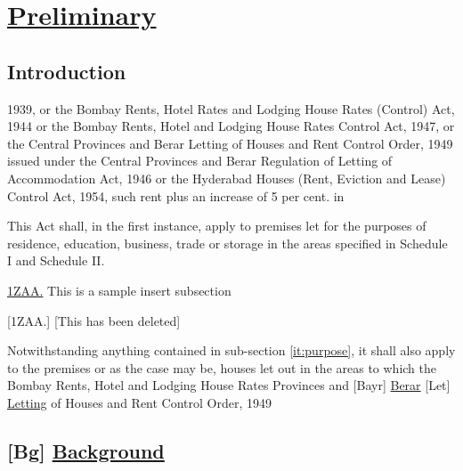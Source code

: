\documentclass[default]{report}
\newcommand{\ins}[1]{\underline{#1}}
\newcommand{\del}[1]{[#1]}
\newcommand{\subs}[2]{\del{#1} \ins{#2}}
\newcommand{\sectionedit}[2]{%
	\titlelabel{#1\quad}
	\section{#2}
	\titlelabel{\thesection\quad}
}
\newcommand{\chapteredit}[2]{%
	\titlelabel{#1\quad}
	\chapter{#2}
	\titlelabel{\thechapter\quad}
}
\begin{document}
\chapteredit{\ins{2}}{\ins{Preliminary}}

\section{Introduction}

1939, or the Bombay Rents, Hotel Rates and Lodging House Rates
(Control) Act, 1944 or the Bombay Rents, Hotel and Lodging House Rates
Control Act, 1947, or the Central Provinces and Berar Letting of
Houses and Rent Control Order, 1949 issued under the Central Provinces
and Berar Regulation of Letting of Accommodation Act, 1946 or the
Hyderabad Houses (Rent, Eviction and Lease) Control Act, 1954, such
rent plus an increase of 5 per cent. in
\begin{list}{.}{%
    \settowidth{}
    \leftmargin{}
    \advance\leftmargin{}
    \advance\leftmargin{} 
    \advance\leftmargin{} 
  }
\item This Act shall, in the first instance, apply to premises let for
  the purposes of residence, education, business, trade or storage in
  the areas specified in Schedule I and Schedule II.
  \label{it:purpose}
\item [\ins{1ZAA.}] This is a sample insert subsection
\item [\del{1ZAA.}] \del{This has been deleted}
\item Notwithstanding anything contained in sub-section
  \ref{it:purpose}, it shall
  also apply to the premises or as the case may be, houses let out in
  the areas to which the Bombay Rents, Hotel and Lodging House Rates
  Provinces and \del{Bayr} \ins{Berar} \subs{Let}{Letting} of Houses and Rent Control Order, 1949
\end{list}


	

\sectionedit{\del{2} \ins{3}}{\del{Bg} \ins{Background}}
\end{document}
